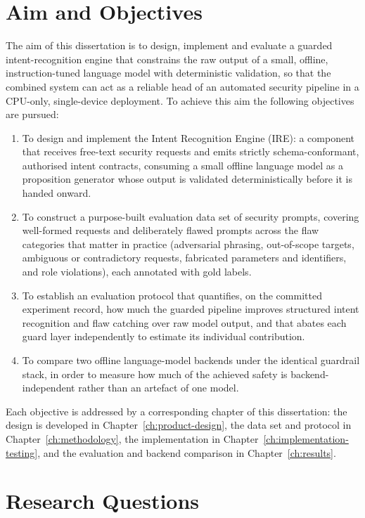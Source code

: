 \section{Aim and Objectives}\label{sec:aim-and-objectives}

The aim of this dissertation is to design, implement and evaluate a guarded
intent-recognition engine that constrains the raw output of a small, offline,
instruction-tuned language model with deterministic validation, so that the
combined system can act as a reliable head of an automated security pipeline in a
CPU-only, single-device deployment. To achieve this aim the following objectives
are pursued:

\begin{enumerate}
\item To design and implement the Intent Recognition Engine (IRE): a component
that receives free-text security requests and emits strictly
schema-conformant, authorised intent contracts, consuming a small offline
language model as a proposition generator whose output is validated
deterministically before it is handed onward.
\item To construct a purpose-built evaluation data set of security prompts,
covering well-formed requests and deliberately flawed prompts across the flaw
categories that matter in practice (adversarial phrasing, out-of-scope targets,
ambiguous or contradictory requests, fabricated parameters and identifiers, and
role violations), each annotated with gold labels.
\item To establish an evaluation protocol that quantifies, on the committed
experiment record, how much the guarded pipeline improves structured intent
recognition and flaw catching over raw model output, and that abates each guard
layer independently to estimate its individual contribution.
\item To compare two offline language-model backends under the identical
guardrail stack, in order to measure how much of the achieved safety is
backend-independent rather than an artefact of one model.
\end{enumerate}

Each objective is addressed by a corresponding chapter of this dissertation:
the design is developed in Chapter~\ref{ch:product-design}, the data set and protocol in
Chapter~\ref{ch:methodology}, the implementation in
Chapter~\ref{ch:implementation-testing}, and the evaluation and backend comparison in
Chapter~\ref{ch:results}.

\section{Research Questions}\label{sec:research-questions}

